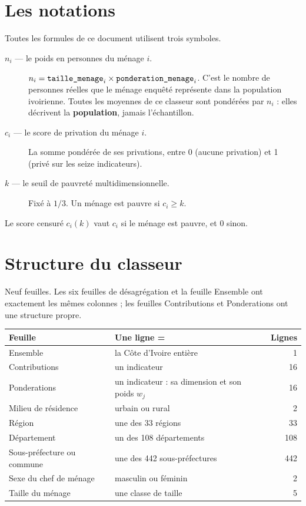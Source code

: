 \documentclass[11pt,a4paper]{article}
\begin{document}
\tableofcontents
\bigskip

\section{Les notations}

Toutes les formules de ce document utilisent trois symboles.

\begin{description}
  \item[$n_i$ --- le poids en personnes du ménage $i$.] $n_i = \texttt{taille\_menage}_i \times
  \texttt{ponderation\_menage}_i$. C'est le nombre de personnes réelles que le ménage enquêté
  représente dans la population ivoirienne. Toutes les moyennes de ce classeur sont pondérées par
  $n_i$ : elles décrivent la \textbf{population}, jamais l'échantillon.

  \item[$c_i$ --- le score de privation du ménage $i$.] La somme pondérée de ses privations,
  entre 0 (aucune privation) et 1 (privé sur les seize indicateurs).

  \item[$k$ --- le seuil de pauvreté multidimensionnelle.] Fixé à $1/3$. Un ménage est pauvre si
  $c_i \ge k$.
\end{description}

Le score censuré $c_i(k)$ vaut $c_i$ si le ménage est pauvre, et $0$ sinon.

\section{Structure du classeur}

Neuf feuilles. Les six feuilles de désagrégation et la feuille \textsf{Ensemble} ont exactement
les mêmes colonnes ; les feuilles \textsf{Contributions} et \textsf{Ponderations} ont une
structure propre.

\begin{center}
\begin{tabular}{@{}llr@{}}
\toprule
\textbf{Feuille} & \textbf{Une ligne =} & \textbf{Lignes} \\
\midrule
\textsf{Ensemble} & la Côte d'Ivoire entière & 1 \\
\textsf{Contributions} & un indicateur & 16 \\
\textsf{Ponderations} & un indicateur : sa dimension et son poids $w_j$ & 16 \\
\textsf{Milieu de résidence} & urbain ou rural & 2 \\
\textsf{Région} & une des 33 régions & 33 \\
\textsf{Département} & un des 108 départements & 108 \\
\textsf{Sous-préfecture ou commune} & une des 442 sous-préfectures & 442 \\
\textsf{Sexe du chef de ménage} & masculin ou féminin & 2 \\
\textsf{Taille du ménage} & une classe de taille & 5 \\
\bottomrule
\end{tabular}
\end{center}
\end{document}
